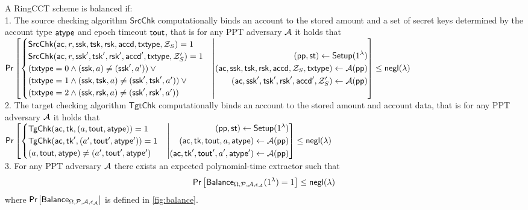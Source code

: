 \begin{definition}[Balance] A RingCCT scheme is balanced if: \\
1. The source checking algorithm $\mathsf{SrcChk}$ computationally binds an account to the stored amount and a set of secret keys determined by the account type $\mathsf{atype}$ and epoch timeout $\mathsf{tout}$, that is for any PPT adversary $\mathcal{A}$ it holds that 
\vspace{0.3cm} \\
$\mathsf{Pr}\left[
    \begin{cases} 
	    \mathsf{SrcChk}(\ac, r, \ssk, \tsk, \rsk, \mathsf{accd}, \txtype, \mathcal{Z}_{S}) = 1 \tabularnewline
	\mathsf{SrcChk}(\ac, r, \ssk', \tsk', \rsk', \mathsf{accd}',\txtype, \mathcal{Z}_{S}') = 1 \tabularnewline
	(\txtype = 0 \land (\ssk, a) \neq (\ssk', a')) \: \lor \tabularnewline 
	(\txtype = 1 \land (\ssk, \tsk, a) \neq (\ssk', \tsk', a')) \: \lor \tabularnewline
	(\txtype = 2 \land (\ssk, \rsk, a) \neq (\ssk', \rsk', a'))
    \end{cases} 
    \middle|
    \begin{aligned}
	(\pp, \st) \gets \mathsf{Setup}(1^\lambda) \\
	(\ac, \ssk, \tsk, \rsk, \accd, \mathcal{Z}_{S}, \txtype) \gets \mathcal{A}(\pp) \\
	(\ac, \ssk', \tsk', \rsk', \accd',  \mathcal{Z}_{S}') \gets \mathcal{A}(\pp) \\
    \end{aligned}
\right]
\leq \negl
$ 
\vspace{0.3cm} \\
2. The target checking algorithm $\mathsf{TgtChk}$ computationally binds an account to the stored amount and account data, that is for any PPT adversary $\mathcal{A}$ it holds that
\vspace{0.3cm} \\
$\mathsf{Pr}\left[
    \begin{cases} 
	\mathsf{TgChk}(\ac, \mathsf{tk}, (a, \tout, \atype)) = 1 \tabularnewline
	\mathsf{TgChk}(\ac, \mathsf{tk}', (a', \tout', \atype')) = 1 \tabularnewline
	(a, \tout, \atype) \neq (a', \tout', \atype')
    \end{cases} 
    \middle|
    \begin{aligned}
	(\pp, \st) \gets \mathsf{Setup}(1^\lambda) \\
	(\ac, \mathsf{tk}, \tout, a, \atype) \gets \mathcal{A}(\pp) \\
	(\ac, \mathsf{tk}', \tout', a', \atype') \gets \mathcal{A}(\pp) \\
    \end{aligned}
\right]
\leq \negl
$ 
\vspace{0.3cm} \\
3. For any PPT adversary $\mathcal{A}$ there exists an expected polynomial-time extractor such that
\begin{equation*}
\mathsf{Pr}\left[\mathsf{Balance}_{\Omega,\mathcal{P},\adv,\epsilon_\adv}(1^\lambda) = 1\right] \leq \negl
\end{equation*}
where $\mathsf{Pr}\left[\mathsf{Balance}_{\Omega,\mathcal{P},\mathcal{A},\epsilon_{\mathcal{A}}}\right]$ is defined in \cref{fig:balance}.\\
\end{definition}

